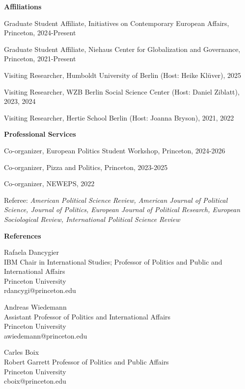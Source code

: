 \documentclass[letterpaper,10pt,oneside]{article}
\begin{document}
{\large \textbf{Affiliations}}

Graduate Student Affiliate, Initiatives on Contemporary European Affairs, Princeton, 2024-Present

Graduate Student Affiliate, Niehaus Center for Globalization and Governance, Princeton, 2021-Present

Visiting Researcher, Humboldt University of Berlin (Host: Heike Klüver), 2025

Visiting Researcher, WZB Berlin Social Science Center (Host: Daniel Ziblatt), 2023, 2024

Visiting Researcher, Hertie School Berlin (Host: Joanna Bryson), 2021, 2022

\vspace{2ex}


{\large \textbf{Professional Services}}

Co-organizer, European Politics Student Workshop, Princeton, 2024-2026

Co-organizer, Pizza and Politics, Princeton, 2023-2025

Co-organizer, NEWEPS, 2022

Referee: \textit{American Political Science Review, American Journal of Political Science, Journal of Politics, European Journal of Political Research, European Sociological Review, International Political Science Review}



\vspace{2ex}




{\large \textbf{References}}

\noindent Rafaela Dancygier \\
IBM Chair in International Studies; Professor of Politics and Public and International Affairs \\
Princeton University \\
rdancygi@princeton.edu

\vspace{1ex}

\noindent Andreas Wiedemann \\
Assistant Professor of Politics and International Affairs \\
Princeton University \\
awiedemann@princeton.edu

\vspace{1ex}

\noindent Carles Boix \\
Robert Garrett Professor of Politics and Public Affairs \\
Princeton University \\
cboix@princeton.edu
\end{document}
